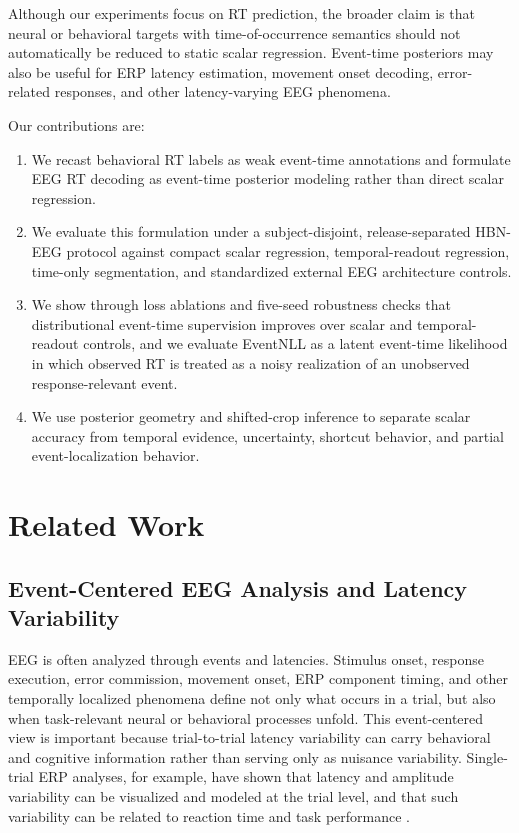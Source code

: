 \documentclass[12pt]{article}
\begin{document}
Although our experiments focus on RT prediction, the broader claim is that neural or behavioral targets with time-of-occurrence semantics should not automatically be reduced to static scalar regression. Event-time posteriors may also be useful for ERP latency estimation, movement onset decoding, error-related responses, and other latency-varying EEG phenomena.

Our contributions are:
\begin{enumerate}
    \item We recast behavioral RT labels as weak event-time annotations and formulate EEG RT decoding as event-time posterior modeling rather than direct scalar regression.
    \item We evaluate this formulation under a subject-disjoint, release-separated HBN-EEG protocol against compact scalar regression, temporal-readout regression, time-only segmentation, and standardized external EEG architecture controls.
    \item We show through loss ablations and five-seed robustness checks that distributional event-time supervision improves over scalar and temporal-readout controls, and we evaluate EventNLL as a latent event-time likelihood in which observed RT is treated as a noisy realization of an unobserved response-relevant event.
    \item We use posterior geometry and shifted-crop inference to separate scalar accuracy from temporal evidence, uncertainty, shortcut behavior, and partial event-localization behavior.
\end{enumerate}

\section{Related Work}

\subsection{Event-Centered EEG Analysis and Latency Variability}
EEG is often analyzed through events and latencies. Stimulus onset, response execution, error commission, movement onset, ERP component timing, and other temporally localized phenomena define not only what occurs in a trial, but also when task-relevant neural or behavioral processes unfold. This event-centered view is important because trial-to-trial latency variability can carry behavioral and cognitive information rather than serving only as nuisance variability. Single-trial ERP analyses, for example, have shown that latency and amplitude variability can be visualized and modeled at the trial level, and that such variability can be related to reaction time and task performance \citep{Jung1998SingleTrialERP,Ouyang2017LatencyReview}.
\end{document}
